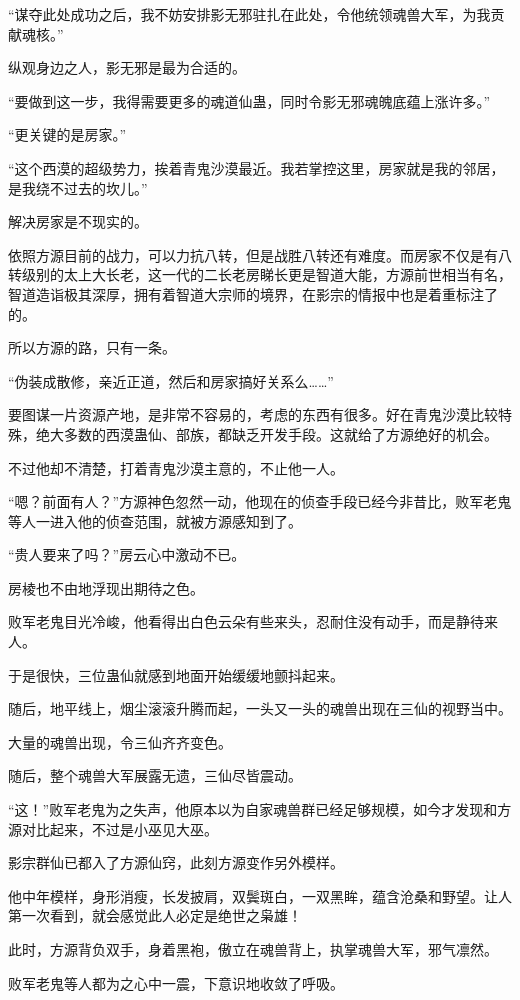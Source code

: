 \begin{this_body}
“谋夺此处成功之后，我不妨安排影无邪驻扎在此处，令他统领魂兽大军，为我贡献魂核。”

纵观身边之人，影无邪是最为合适的。

“要做到这一步，我得需要更多的魂道仙蛊，同时令影无邪魂魄底蕴上涨许多。”

“更关键的是房家。”

“这个西漠的超级势力，挨着青鬼沙漠最近。我若掌控这里，房家就是我的邻居，是我绕不过去的坎儿。”

解决房家是不现实的。

依照方源目前的战力，可以力抗八转，但是战胜八转还有难度。而房家不仅是有八转级别的太上大长老，这一代的二长老房睇长更是智道大能，方源前世相当有名，智道造诣极其深厚，拥有着智道大宗师的境界，在影宗的情报中也是着重标注了的。

所以方源的路，只有一条。

“伪装成散修，亲近正道，然后和房家搞好关系么……”

要图谋一片资源产地，是非常不容易的，考虑的东西有很多。好在青鬼沙漠比较特殊，绝大多数的西漠蛊仙、部族，都缺乏开发手段。这就给了方源绝好的机会。

不过他却不清楚，打着青鬼沙漠主意的，不止他一人。

“嗯？前面有人？”方源神色忽然一动，他现在的侦查手段已经今非昔比，败军老鬼等人一进入他的侦查范围，就被方源感知到了。

“贵人要来了吗？”房云心中激动不已。

房棱也不由地浮现出期待之色。

败军老鬼目光冷峻，他看得出白色云朵有些来头，忍耐住没有动手，而是静待来人。

于是很快，三位蛊仙就感到地面开始缓缓地颤抖起来。

随后，地平线上，烟尘滚滚升腾而起，一头又一头的魂兽出现在三仙的视野当中。

大量的魂兽出现，令三仙齐齐变色。

随后，整个魂兽大军展露无遗，三仙尽皆震动。

“这！”败军老鬼为之失声，他原本以为自家魂兽群已经足够规模，如今才发现和方源对比起来，不过是小巫见大巫。

影宗群仙已都入了方源仙窍，此刻方源变作另外模样。

他中年模样，身形消瘦，长发披肩，双鬓斑白，一双黑眸，蕴含沧桑和野望。让人第一次看到，就会感觉此人必定是绝世之枭雄！

此时，方源背负双手，身着黑袍，傲立在魂兽背上，执掌魂兽大军，邪气凛然。

败军老鬼等人都为之心中一震，下意识地收敛了呼吸。


\end{this_body}

